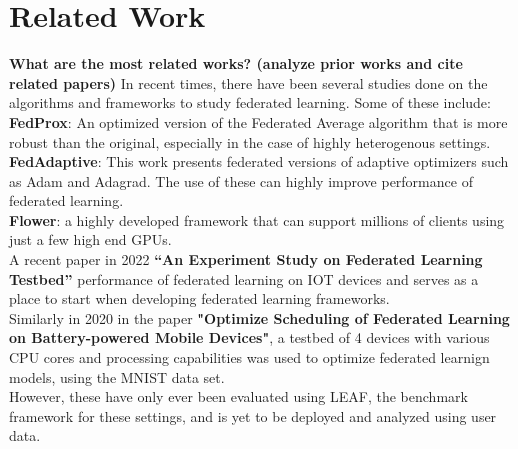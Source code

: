 \section{Related Work}
    \textbf{What are the most related works? (analyze prior works and cite related papers)}
    In recent times, there have been several studies done on the algorithms and frameworks to study federated learning. Some of these include:\\

    \textbf{FedProx}: An optimized version of the Federated Average algorithm that is more robust than the original, especially in the case of highly heterogenous settings. \\

    \textbf{FedAdaptive}: This work presents federated versions of adaptive optimizers such as Adam and Adagrad. The use of these can highly improve performance of federated learning.\\

    \textbf{Flower}: a highly developed framework that can support millions of clients using just a few high end GPUs.\\

    A recent paper in 2022 \textbf{“An Experiment Study on Federated Learning Testbed”} performance of federated learning on IOT devices and serves as a place to start when developing federated learning frameworks.\\

    Similarly in 2020 in the paper \textbf{"Optimize Scheduling of Federated Learning on Battery-powered Mobile Devices"}, a testbed of 4 devices with various CPU cores and processing capabilities was used to optimize federated learnign models, using the MNIST data set.\\

    However, these have only ever been evaluated using LEAF, the benchmark framework for these settings, and is yet to be deployed and analyzed using user data.


